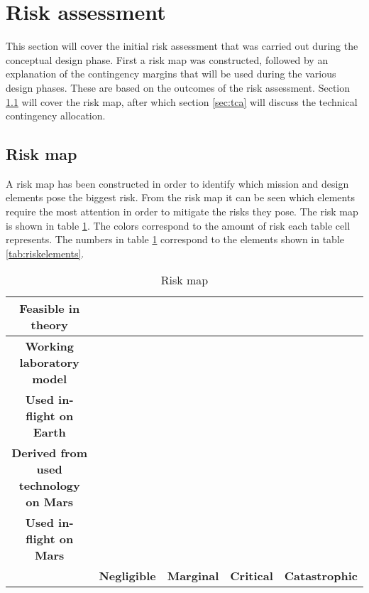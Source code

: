 \section{Risk assessment} 
\label{ch:risk}
This section will cover the initial risk assessment that was carried out during the conceptual design phase. First a risk map was constructed, followed by an explanation of the contingency margins that will be used during the various design phases. These are based on the outcomes of the risk assessment. Section \ref{sec:riskmap} will cover the risk map, after which section \ref{sec:tca} will discuss the technical contingency allocation.

\subsection{Risk map}
\label{sec:riskmap}
 A risk map has been constructed in order to identify which mission and design elements pose the biggest risk. From the risk map it can be seen which elements require the most attention in order to mitigate the risks they pose. The risk map is shown in table \ref{tab:riskmap}. The colors correspond to the amount of risk each table cell represents. The numbers in table \ref{tab:riskmap} correspond to the elements shown in table \ref{tab:riskelements}.

\begin{table}[h]
\centering
\caption{Risk map}
\label{tab:riskmap}
    \begin{tabular}{|c|c|c|c|c|}
    \hline
    \textbf{Feasible in theory} & \cellcolor{green} & \cellcolor{yellow} & \cellcolor{red} & \cellcolor{red} \\ \hline
    \textbf{Working laboratory model} & \cellcolor{green} & \cellcolor{yellow} & \cellcolor{red} & \cellcolor{red} \\ \hline
    \textbf{Used in-flight on Earth} & \cellcolor{green} & \cellcolor{yellow} & \cellcolor{yellow} & \cellcolor{yellow} \\ \hline
    \textbf{Derived from used technology on Mars} & \cellcolor{green} & \cellcolor{yellow} & \cellcolor{yellow} & \cellcolor{yellow} \\ \hline
    \textbf{Used in-flight on Mars} & \cellcolor{green} & \cellcolor{green} & \cellcolor{green} & \cellcolor{green} \\ \hline
     & \textbf{Negligible} & \textbf{Marginal} & \textbf{Critical} & \textbf{Catastrophic} \\ \hline
    \end{tabular}
\end{table}

